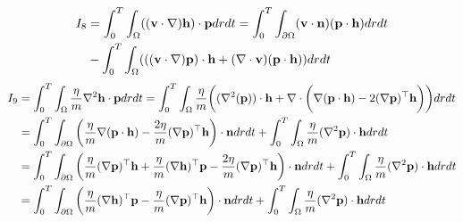\begin{align*}
I_8&=\int_0^T \int_\Omega ((\mathbf{v} \cdot \nabla)\mathbf{h}) \cdot \mathbf{p} dr dt
= \int_0^T \int_{\partial \Omega}(\mathbf{v} \cdot \mathbf{n})(\mathbf{p} \cdot \mathbf{h})dr dt \\
&- \int_0^T \int_\Omega ( ((\mathbf{v} \cdot \nabla)\mathbf{p})\cdot \mathbf{h} +(\nabla \cdot \mathbf{v})(\mathbf{p} \cdot \mathbf{h}) )drdt
\end{align*}
\begin{align*}
I_9 &= \int_0^T \int_\Omega \frac{\eta}{m} \nabla^2 \mathbf{h} \cdot \mathbf{p} dr dt =
\int_0^T \int_\Omega \frac{\eta}{m} \bigg( ( \nabla^2 (\mathbf{p}) ) \cdot \mathbf{h} + \nabla \cdot \bigg( \nabla ( \mathbf{p} \cdot \mathbf{h} ) - 2 (\nabla\mathbf{p})^\top \mathbf{h} \bigg) \bigg) dr dt\\
&= \int_0^T \int_{\partial \Omega} \bigg(\frac{\eta}{m}  \nabla ( \mathbf{p} \cdot \mathbf{h} ) - \frac{2\eta}{m}  (\nabla \mathbf{p})^\top \mathbf{h} \bigg) \cdot \mathbf{n} dr dt + \int_0^T \int_\Omega\frac{\eta}{m}  ( \nabla^2 \mathbf{p} ) \cdot \mathbf{h} dr dt\\
&=\int_0^T \int_{\partial \Omega} \bigg(\frac{\eta}{m} (\nabla \mathbf{p})^\top \mathbf{h} + \frac{\eta}{m}(\nabla \mathbf{h})^\top \mathbf{p} - \frac{2\eta}{m}  (\nabla \mathbf{p})^\top \mathbf{h} \bigg) \cdot \mathbf{n} dr dt + \int_0^T \int_\Omega\frac{\eta}{m}  ( \nabla^2 \mathbf{p} ) \cdot \mathbf{h} dr dt \\
&=\int_0^T \int_{\partial \Omega} \bigg(\frac{\eta}{m}(\nabla \mathbf{h})^\top \mathbf{p} - \frac{\eta}{m}  (\nabla \mathbf{p})^\top \mathbf{h} \bigg) \cdot \mathbf{n} dr dt + \int_0^T \int_\Omega\frac{\eta}{m}  ( \nabla^2 \mathbf{p} ) \cdot \mathbf{h} dr dt
\end{align*}

